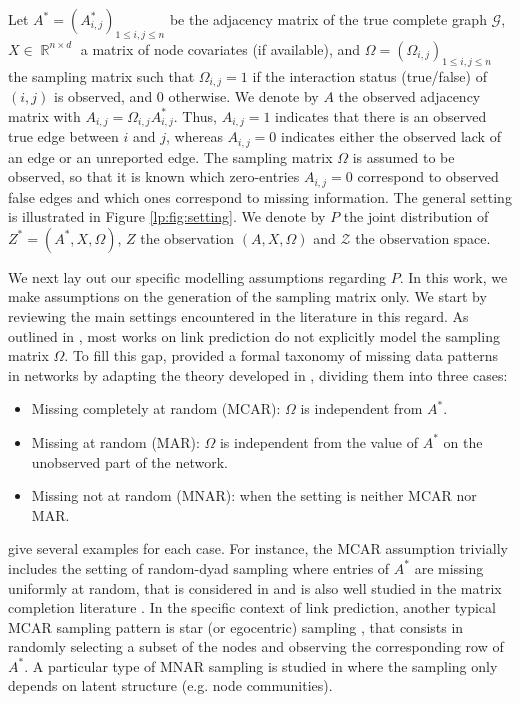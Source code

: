 \documentclass[a4paper, 11pt]{article}
\theoremstyle{remark}
\DeclareMathOperator{\R}{\mathbb{R}}
\newcommand{\EM}{\ensuremath}
\newcommand{\cG}{\EM{\mathcal{G}}}
\newcommand{\cZ}{\EM{\mathcal{Z}}}
\begin{document}
Let $A^* = (A^*_{i,j})_{1 \leq i,j \leq n}$ be the adjacency matrix of the true complete graph $\cG$, $X \in \R^{n \times d}$ a matrix of node covariates (if available), and $\Omega = (\Omega_{i,j})_{1 \leq i,j \leq n}$ the sampling matrix such that $\Omega_{i,j} = 1$ if the interaction status (true/false) of $(i,j)$ is observed, and $0$ otherwise. 
We denote by $A$ the observed adjacency matrix with $A_{i,j} = \Omega_{i,j} A^*_{i,j}$. Thus, $A_{i,j}=1$ indicates that there is an observed true edge between $i$ and $j$, whereas $A_{i,j}=0$ indicates either the observed lack of an edge or an unreported edge. The sampling matrix $\Omega$ is assumed to be observed, so that it is known which zero-entries $A_{i,j}=0$ correspond to observed false edges and which ones correspond to missing information. 
The general setting is illustrated in Figure \ref{lp:fig:setting}. 
We denote by $P$ the joint distribution of $Z^* = (A^*, X, \Omega)$, 
$Z$ the observation $(A, X, \Omega)$ and $\cZ$ the observation space. 

We next lay out our specific modelling assumptions regarding $P$. In this work, we make assumptions on the generation of the sampling matrix only. We start by reviewing the main settings encountered in the literature in this regard. 
As outlined in \cite{chiquet20}, most works on link prediction do not explicitly model the sampling matrix $\Omega$. %
To fill this gap, \cite{chiquet20} provided a formal taxonomy of missing data patterns in networks by adapting the theory developed in \cite{little2019statistical}, dividing them into three cases:%
\begin{itemize}
\item Missing completely at random (MCAR): $\Omega$ is independent from $A^*$. 
\item Missing at random (MAR): $\Omega$ is independent from the value of $A^*$ on the unobserved part of the network. 
\item Missing not at random (MNAR): when the setting is neither MCAR nor MAR. 
\end{itemize}  
\cite{chiquet20} give several examples for each case. For instance, the MCAR assumption trivially includes the setting of random-dyad sampling where entries of $A^*$ are missing uniformly at random, that is considered in \cite{gao2016optimal} and is also well studied in the matrix completion literature \citep{candes2012exact, candes2010matrix, chatterjee15}. In the specific context of link prediction, another typical MCAR sampling pattern is star (or egocentric) sampling \citep{levina23}, that consists in randomly selecting a subset of the nodes and observing the corresponding row of $A^*$. A particular type of MNAR sampling is studied in \cite{gaucher21} where the sampling only depends on latent structure (e.g. node communities).  
\end{document}
